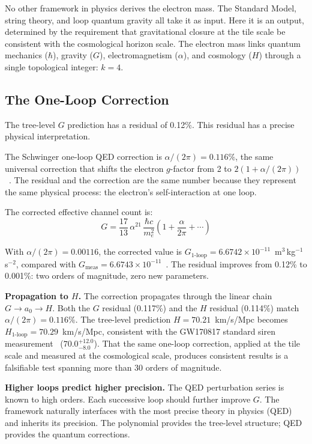 \documentclass[aps,prd,preprint,superscriptaddress,showpacs,preprintnumbers,amsmath,amssymb,nofootinbib]{revtex4-2}
\begin{document}
No other framework in physics derives the electron mass. The Standard Model, string theory, and loop quantum gravity all take it as input. Here it is an output, determined by the requirement that gravitational closure at the tile scale be consistent with the cosmological horizon scale. The electron mass links quantum mechanics ($\hbar$), gravity ($G$), electromagnetism ($\alpha$), and cosmology ($H$) through a single topological integer: $k = 4$.

\subsection{The One-Loop Correction}
\label{subsec:one-loop}

The tree-level $G$ prediction has a residual of 0.12\%. This residual has a precise physical interpretation.

The Schwinger one-loop QED correction is $\alpha/(2\pi) = 0.116\%$, the same universal correction that shifts the electron $g$-factor from 2 to $2(1 + \alpha/(2\pi))$~\cite{schwinger1948}. The residual and the correction are the same number because they represent the same physical process: the electron's self-interaction at one loop.

The corrected effective channel count is:
\begin{equation}
G = \frac{17}{13}\,\alpha^{21}\,\frac{\hbar c}{m_e^2}\left(1 + \frac{\alpha}{2\pi} + \cdots\right)
\label{eq:G-oneloop}
\end{equation}

With $\alpha/(2\pi) = 0.00116$, the corrected value is $G_{1\text{-loop}} = 6.6742 \times 10^{-11}$~m$^3$\,kg$^{-1}$\,s$^{-2}$, compared with $G_{\text{meas}} = 6.6743 \times 10^{-11}$~\cite{codata2022}. The residual improves from 0.12\% to 0.001\%: two orders of magnitude, zero new parameters.

\textbf{Propagation to $H$.} The correction propagates through the linear chain $G \to a_0 \to H$. Both the $G$ residual (0.117\%) and the $H$ residual (0.114\%) match $\alpha/(2\pi) = 0.116\%$. The tree-level prediction $H = 70.21$~km/s/Mpc becomes $H_{1\text{-loop}} = 70.29$~km/s/Mpc, consistent with the GW170817 standard siren measurement~\cite{gw170817} ($70.0^{+12.0}_{-8.0}$). That the same one-loop correction, applied at the tile scale and measured at the cosmological scale, produces consistent results is a falsifiable test spanning more than 30 orders of magnitude.

\textbf{Higher loops predict higher precision.} The QED perturbation series is known to high orders. Each successive loop should further improve $G$. The framework naturally interfaces with the most precise theory in physics (QED) and inherits its precision. The polynomial provides the tree-level structure; QED provides the quantum corrections.
\end{document}

